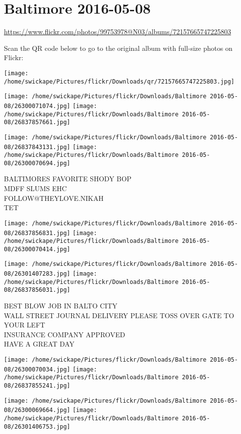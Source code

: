 \documentclass[10pt,letterpaper]{article}
\title{}
\author{}
\date{}
\begin{document}
\section*{Baltimore 2016-05-08}

\url{https://www.flickr.com/photos/99753978@N03/albums/72157665747225803}

Scan the QR code below to go to the original album with full-size photos on Flickr:

\texttt{[image: /home/swickape/Pictures/flickr/Downloads/qr/72157665747225803.jpg]}
\pagebreak

\texttt{[image: /home/swickape/Pictures/flickr/Downloads/Baltimore 2016-05-08/26300071074.jpg]}
\texttt{[image: /home/swickape/Pictures/flickr/Downloads/Baltimore 2016-05-08/26837857661.jpg]}

\texttt{[image: /home/swickape/Pictures/flickr/Downloads/Baltimore 2016-05-08/26837843131.jpg]}
\texttt{[image: /home/swickape/Pictures/flickr/Downloads/Baltimore 2016-05-08/26300070694.jpg]}

BALTIMORES FAVORITE SHODY BOP\\
MDFF SLUMS EHC\\
FOLLOW@THEYLOVE.NIKAH\\
TET
\pagebreak

\texttt{[image: /home/swickape/Pictures/flickr/Downloads/Baltimore 2016-05-08/26837856831.jpg]}
\texttt{[image: /home/swickape/Pictures/flickr/Downloads/Baltimore 2016-05-08/26300070414.jpg]}

\texttt{[image: /home/swickape/Pictures/flickr/Downloads/Baltimore 2016-05-08/26301407283.jpg]}
\texttt{[image: /home/swickape/Pictures/flickr/Downloads/Baltimore 2016-05-08/26837856031.jpg]}

BEST BLOW JOB IN BALTO CITY\\
WALL STREET JOURNAL DELIVERY PLEASE TOSS OVER GATE TO YOUR LEFT\\
INSURANCE COMPANY APPROVED\\
HAVE A GREAT DAY
\pagebreak

\texttt{[image: /home/swickape/Pictures/flickr/Downloads/Baltimore 2016-05-08/26300070034.jpg]}
\texttt{[image: /home/swickape/Pictures/flickr/Downloads/Baltimore 2016-05-08/26837855241.jpg]}

\texttt{[image: /home/swickape/Pictures/flickr/Downloads/Baltimore 2016-05-08/26300069664.jpg]}
\texttt{[image: /home/swickape/Pictures/flickr/Downloads/Baltimore 2016-05-08/26301406753.jpg]}
\end{document}
